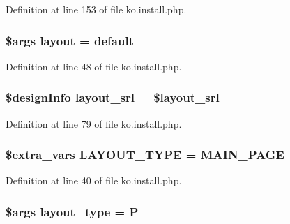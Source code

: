 Definition at line 153 of file ko.\+install.\+php.

\hypertarget{ko_8install_8php_a0dc2cdff7167f362443808ff71ae5177}{}
\subsubsection[{layout}]{\setlength{\rightskip}{0pt plus 5cm}\$args {\bf layout} = \textquotesingle{}default\textquotesingle{}}\label{ko_8install_8php_a0dc2cdff7167f362443808ff71ae5177}


Definition at line 48 of file ko.\+install.\+php.

\hypertarget{ko_8install_8php_a70054876db09b2519a1726663c8dd9e7}{}
\subsubsection[{layout\+\_\+srl}]{\setlength{\rightskip}{0pt plus 5cm}\$design\+Info layout\+\_\+srl = \$layout\+\_\+srl}\label{ko_8install_8php_a70054876db09b2519a1726663c8dd9e7}


Definition at line 79 of file ko.\+install.\+php.

\hypertarget{ko_8install_8php_a559e719d2ff17f12b8fba72773e6601d}{}
\subsubsection[{L\+A\+Y\+O\+U\+T\+\_\+\+T\+Y\+P\+E}]{\setlength{\rightskip}{0pt plus 5cm}\${\bf extra\+\_\+vars} L\+A\+Y\+O\+U\+T\+\_\+\+T\+Y\+P\+E = \textquotesingle{}M\+A\+I\+N\+\_\+\+P\+A\+G\+E\textquotesingle{}}\label{ko_8install_8php_a559e719d2ff17f12b8fba72773e6601d}


Definition at line 40 of file ko.\+install.\+php.

\hypertarget{ko_8install_8php_a0532d89570cfdaebc628afac2ff5a81b}{}
\subsubsection[{layout\+\_\+type}]{\setlength{\rightskip}{0pt plus 5cm}\$args layout\+\_\+type = \textquotesingle{}P\textquotesingle{}}\label{ko_8install_8php_a0532d89570cfdaebc628afac2ff5a81b}


